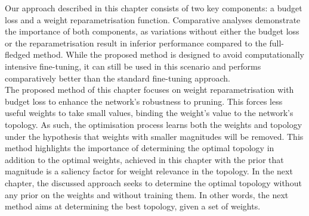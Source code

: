 Our approach described in this chapter consists of two key components: a budget
loss and a weight reparametrisation function. Comparative analyses demonstrate
the importance of both components, as variations without either the budget loss
or the reparametrisation result in inferior performance compared to the
full-fledged method. While the proposed method is designed to avoid
computationally intensive fine-tuning, it can still be used in this scenario and
performs comparatively better than the standard fine-tuning approach.\\

The proposed method of this chapter focuses on weight reparametrisation with
budget loss to enhance the network's robustness to pruning. This forces less
useful weights to take small values, binding the weight's value to the network's
topology. As such, the optimisation process learns both the weights and topology
under the hypothesis that weights with smaller magnitudes will be removed. This
method highlights the importance of determining the optimal topology in addition
to the optimal weights, achieved in this chapter with the prior that magnitude
is a saliency factor for weight relevance in the topology. In the next chapter,
the discussed approach seeks to determine the optimal topology without any prior
on the weights and without training them. In other words, the next method aims
at determining the best topology, given a set of weights.


